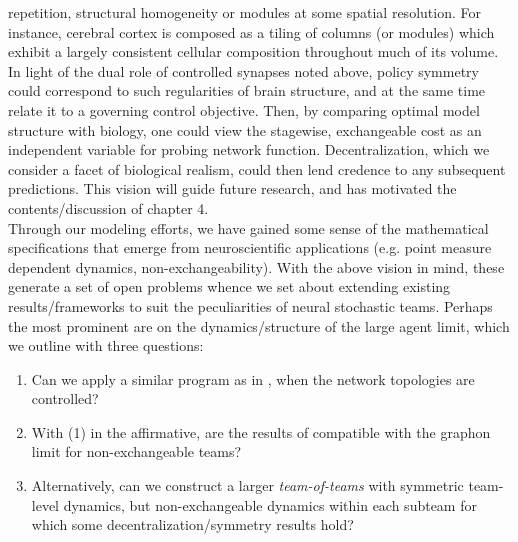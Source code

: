 \documentclass[12pt, oneside]{report}
\newcommand{\1}[1]{\mathbbm{1}_{\{#1\}}}
\theoremstyle{definition}
\begin{document}
repetition, structural homogeneity or modules at some spatial resolution. For instance, cerebral cortex is composed as a tiling of columns (or modules) which exhibit a largely consistent cellular composition throughout much of its volume. 
In light of the dual role of controlled synapses noted above, policy symmetry could correspond to such regularities of brain structure, and at the same time relate it to a governing control objective. Then, by comparing optimal model structure
with biology, one could view the stagewise, exchangeable cost as an independent variable for probing network function. Decentralization, which we consider a facet of biological realism,
could then lend credence to any subsequent predictions. This vision will guide future research, and has motivated the contents/discussion of chapter 4.\\[5pt]
\indent Through our modeling efforts, we have gained some sense of the mathematical specifications that emerge from neuroscientific applications (e.g. point measure dependent dynamics, non-exchangeability). With the above vision in mind, these generate a set of open problems
whence we set about extending existing results/frameworks to suit the peculiarities of neural stochastic teams. Perhaps the most prominent are on the dynamics/structure of the large agent limit, which we outline with three questions:
\begin{enumerate}
    \item Can we apply a similar program as in \cite{Jabin_Zhou_2023}, \cite{Jabin_Schmutz_Zhou_2024} when the network topologies are controlled?
    \item With (1) in the affirmative, are the results of \cite{Sanjari_Saldi_Yüksel_2024} compatible with the graphon limit for non-exchangeable teams?
    \item Alternatively, can we construct a larger \textit{team-of-teams} with symmetric team-level dynamics, but non-exchangeable dynamics within each subteam for which some decentralization/symmetry results hold?
\end{enumerate}
\end{document}
